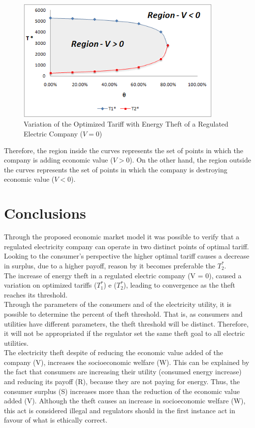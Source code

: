 \documentclass[preprint,12pt]{elsarticle}
\begin{document}
\begin{figure}[h]%
\centering
\includegraphics[width = 0.9\textwidth]{Fig12.png} 
\caption{Variation of the Optimized Tariff with Energy Theft of a Regulated Electric Company ($V = 0$)}
\label{Fig12}
\end{figure}
Therefore, the region inside the curves represents the set of points in which the company is adding economic value ($V > 0$). On the other hand, the region outside the curves represents the set of points in which the company is destroying economic value ($V < 0$).

\section{Conclusions}
\label{S.5}
Through the proposed economic market model it was possible to verify that a regulated electricity company can operate in two distinct points of optimal tariff. Looking to the consumer's perspective the higher optimal tariff causes a decrease in surplus, due to a higher payoff, reason by it becomes preferable the $T_2^*$.\\
The increase of energy theft in a regulated electric company (V = 0), caused a variation on optimized tariffs ($T_1^*$) e ($T_2^*$), leading to convergence as the theft reaches its threshold.\\
Through the parameters of the consumers and of the electricity utility, it is possible to determine the percent of theft threshold. That is, as consumers and utilities have different parameters, the theft threshold will be distinct. Therefore, it will not be appropriated if the regulator set the same theft goal to all electric utilities.\\
The electricity theft despite of reducing the economic value added of the company (V), increases the socioeconomic welfare (W). This can be explained by the fact that consumers are increasing their utility (consumed energy increase) and reducing its payoff (R), because they are not paying for energy. Thus, the consumer surplus (S) increases more than the reduction of the economic value added (V). Although the theft causes an increase in socioeconomic welfare (W), this act is considered illegal and regulators should in the first instance act in favour of what is ethically correct.\\
\end{document}

